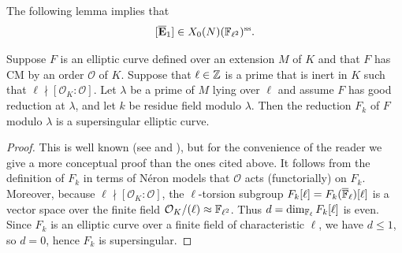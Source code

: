 \documentclass{article} \usepackage[active]{srcltx}
\newcommand{\eE}{\mathbf{E}}
\newcommand{\Felltwo}{\F_{\ell^2}}
\renewcommand{\O}{\mathcal{O}}
\DeclareMathOperator{\supersingular}{ss}
\renewcommand{\ss}{\supersingular}
\begin{document}
The following lemma implies that
$$
  [\overline{\eE}_1] \in X_0(N)(\Felltwo)^{\ss}.
$$
\begin{lemma}\label{lem:cmred}
Suppose $F$ is an elliptic curve defined over an extension $M$ of $K$ and that
$F$ has  CM by an order $\O$ of $K$. Suppose that $\ell\in\mathbb{Z}$ is a prime
that is inert in $K$ such that $\ell\nmid [\O_K:\O]$.  
Let $\lambda$ be a prime of $M$ lying over $\ell$ and
assume $F$ has good reduction at $\lambda$, and let $k$ be residue field
modulo $\lambda$.
Then the reduction $F_k$ of $F$ modulo $\lambda$ is a supersingular
elliptic curve.
\end{lemma}
\begin{proof}
  This is well known (see \cite[Ch.~10, \S4, Thm.~10, Case
  1]{lang:elliptic} and \cite[Exercise
  2.30]{silverman:aec2}), but for the convenience of the reader we
  give a more conceptual proof than the ones cited above.
  It follows from the definition of $F_k$ in terms of N\'eron models
  that $\O$ acts (functorially) on $F_k$.  Moreover, because
  $\ell\nmid [\O_K:\O]$, the $\ell$-torsion subgroup $F_k[\ell] =
  F_k(\overline{\mathbb{F}}_{\ell})[\ell]$ is a vector space over the finite field
  $\O_K/(\ell) \ncisom \F_{\ell^2}$.  Thus $d=\dim_{\mathbb{F}_{\ell}}
  F_k[\ell]$ is even.  Since $F_k$ is an elliptic curve over a finite
  field of characteristic $\ell$, we have $d\leq 1$, so $d=0$, hence
  $F_k$ is supersingular.
\end{proof}
\end{document}
